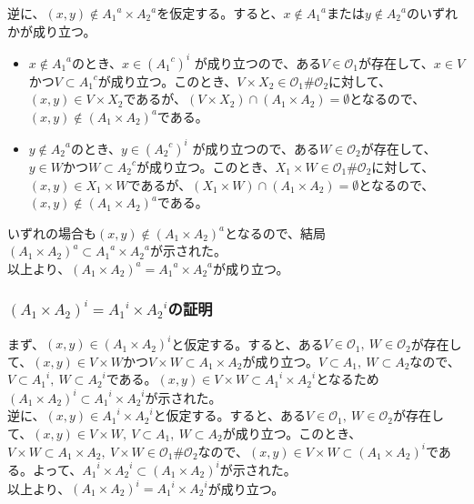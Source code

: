 \documentclass{jsarticle}
\begin{document}
逆に、$(x,y)\notin {A_1}^a\times{A_2}^a$を仮定する。すると、$x\notin {A_1}^a$または$y\notin {A_2}^a$のいずれかが成り立つ。
\begin{itemize}
\item
$x\notin {A_1}^a$のとき、$x\in({A_1}^c)^i$ が成り立つので、ある$V\in\mathcal{O}_1$が存在して、$x\in V$かつ$V\subset {A_1}^c$が成り立つ。このとき、$V\times X_2\in\mathcal{O}_1\#\mathcal{O}_2$に対して、$(x,y)\in V\times X_2$であるが、$(V\times X_2)\cap(A_1\times A_2)=\emptyset$となるので、$(x,y)\notin(A_1\times A_2)^a$である。
\item
$y\notin {A_2}^a$のとき、$y\in({A_2}^c)^i$ が成り立つので、ある$W\in\mathcal{O}_2$が存在して、$y\in W$かつ$W\subset {A_2}^c$が成り立つ。このとき、$X_1\times W\in\mathcal{O}_1\#\mathcal{O}_2$に対して、$(x,y)\in X_1\times W$であるが、$(X_1\times W)\cap(A_1\times A_2)=\emptyset$となるので、$(x,y)\notin(A_1\times A_2)^a$である。
\end{itemize}
いずれの場合も$(x,y)\notin (A_1\times A_2)^a$となるので、結局$(A_1\times A_2)^a\subset {A_1}^a\times{A_2}^a$が示された。\\

以上より、$(A_1\times A_2)^a={A_1}^a\times {A_2}^a$が成り立つ。

\subsubsection{$(A_1\times A_2)^i={A_1}^i\times {A_2}^i$の証明}
まず、$(x,y)\in (A_1\times A_2)^i$と仮定する。すると、ある$V\in\mathcal{O}_1,\ W\in\mathcal{O}_2$が存在して、$(x,y)\in V\times W$かつ$V\times W\subset A_1\times A_2$が成り立つ。$V\subset A_1,\ W\subset A_2$なので、$V\subset {A_1}^i,\ W\subset{A_2}^i$である。$(x,y)\in V\times W\subset {A_1}^i\times{A_2}^i$となるため$(A_1\times A_2)^i\subset{A_1}^i\times {A_2}^i$が示された。\\


逆に、$(x,y)\in{A_1}^i\times {A_2}^i$と仮定する。すると、ある$V\in\mathcal{O}_1,\ W\in\mathcal{O}_2$が存在して、$(x,y)\in V\times W,\ V\subset A_1,\  W\subset A_2$が成り立つ。このとき、$V\times W\subset A_1\times A_2,\ V\times W\in\mathcal{O}_1\#\mathcal{O}_2$なので、$(x,y)\in V\times W\subset (A_1\times A_2)^i$である。よって、${A_1}^i\times {A_2}^i\subset(A_1\times A_2)^i$が示された。\\

以上より、$(A_1\times A_2)^i={A_1}^i\times {A_2}^i$が成り立つ。



\end{document}
